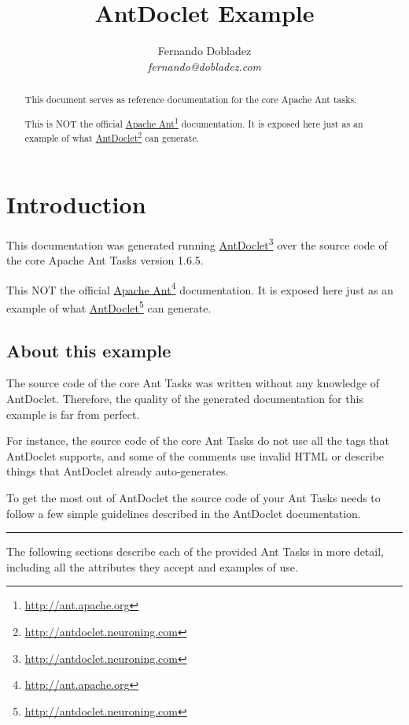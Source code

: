\documentclass[letterpaper,11pt,oneside]{article}
\title{AntDoclet Example}
\author{Fernando Dobladez\\\smaller\slshape{}fernando@dobladez.com}
\newcommand{\webLink}[2]{\href{#2}{#1}\footnote{\href{#2}{#2}}}
\begin{document}
\maketitle %
\newpage
\begin{abstract}
This document serves as reference documentation for the core Apache Ant tasks.

This is NOT the official \webLink{Apache Ant}{http://ant.apache.org}
documentation. It is exposed here just as an example of what
\webLink{AntDoclet}{http://antdoclet.neuroning.com} can generate.

\end{abstract}

\tableofcontents
\newpage


\section{Introduction}
This documentation was generated running
\webLink{AntDoclet}{http://antdoclet.neuroning.com} over the source
code of the core Apache Ant Tasks version 1.6.5.

This NOT the official \webLink{Apache Ant}{http://ant.apache.org}
documentation. It is exposed here just as an example of what
\webLink{AntDoclet}{http://antdoclet.neuroning.com} can generate.


\subsection{About this example}
The source code of the core Ant Tasks was written without
any knowledge of AntDoclet. Therefore, the quality of the generated
documentation for this example is far from perfect.

For instance, the source code of the core Ant Tasks do not use all the
tags that AntDoclet supports, and some of the comments use invalid
HTML or describe things that AntDoclet already auto-generates.

To get the most out of AntDoclet the source code of your Ant Tasks
needs to follow a few simple guidelines described in the AntDoclet
documentation.

\vspace{1cm}
\hrule
The following sections describe each of the provided Ant Tasks in
more detail, including all the attributes they accept and examples of
use.



\end{document}
